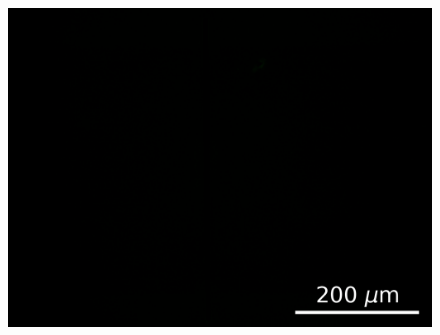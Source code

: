 \documentclass[
  a4paper,
]{scrbook}
\begin{document}
\begin{figure}
\begin{minipage}[t]{0.47\linewidth}
{{\includegraphics{figures/ch6/modified_SU8only_FITCfilter_channel2_350ms_12.6X_221207.png}

}

}

\subcaption{\label{fig-350ms-SU8}}
\end{minipage}%
\newline
\begin{minipage}[t]{0.47\linewidth}

{\centering 

}
\end{minipage}
\end{figure}
\end{document}
